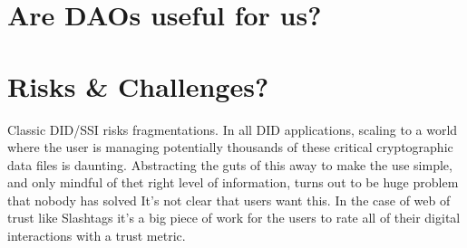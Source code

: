 \section{Are DAOs useful for us?}

\section{Risks \& Challenges?}
Classic DID/SSI risks fragmentations. 
In all DID applications, scaling to a world where the user is managing potentially thousands of these critical cryptographic data files is daunting.
Abstracting the guts of this away to make the use simple, and only mindful of thet right level of information, turns out to be huge problem that nobody has solved
It's not clear that users want this. 
In the case of web of trust like Slashtags it's a big piece of work for the users to rate all of their digital interactions with a trust metric.



